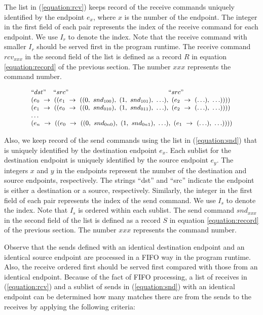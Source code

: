 The list in (\ref{equation:rcv}) keeps record of the receive commands uniquely identified by the endpoint $\mathit{e}_x$, where $x$ is the number of the endpoint. The integer in the first field of each pair represents the index of the receive command for each endpoint. We use $I_r$ to denote the index. Note that the receive command with smaller $I_r$ should be served first in the program runtime. The receive command $rcv_{xxx}$ in the second field of the list is defined as a record $R$ in equation \ref{equation:record} of the previous section. The number $xxx$ represents the command number.

\begin{equation}
\footnotesize \begin{array}{l}
 ``dst" \;\;\;\; ``src" \;\;\;\;\;\;\;\;\;\;\;\;\;\;\;\;\;\;\;\;\;\;\;\;\;\;\;\;\;\;\;\;\;\;\;\;\;\;\;\;\;\;\;\;\;\;\;\;\;\;\;\;\;\;\; ``src"\\
(e_0\ \rightarrow\ ((e_1\ \rightarrow\ ((0,\ snd_{100}),\ (1,\ snd_{101}),\ \ldots),\ (e_2\ \rightarrow\ (\ldots),\ \ldots))))\\
(e_1\ \rightarrow\ ((e_0\ \rightarrow\ ((0,\ snd_{010}),\ (1,\ snd_{011}),\ \ldots),\ (e_2\ \rightarrow\ (\ldots),\ \ldots))))\\
 \dots\\
(e_n\ \rightarrow\ ((e_0\ \rightarrow\ ((0,\ snd_{0n0}),\ (1,\ snd_{0n1}),\ \ldots),\ (e_1\ \rightarrow\ (\ldots),\ \ldots))))\\
\end{array}
\label{equation:snd}
\end{equation}

Also, we keep record of the send commands using the list in (\ref{equation:snd}) that is uniquely identified by the destination endpoint $\mathit{e}_x$. Each sublist for the destination endpoint is uniquely identified by the source endpoint $\mathit{e}_y$. The integers $x$ and $y$ in the endpoints represent the number of the destination and source endpoints, respectively. The strings ``dst'' and ``src'' indicate the endpoint is either a destination or a source, respectively. Similarly, the integer in the first field of each pair represents the index of the send command. We use $I_s$ to denote the index. Note that $I_s$ is ordered within each sublist. The send command $snd_{xxx}$ in the second field of the list is defined as a record $S$ in equation \ref{equation:record} of the previous section. The number $xxx$ represents the command number.

Observe that the sends defined with an identical destination endpoint and an identical source endpoint are processed in a FIFO way in the program runtime. Also, the receive ordered first should be served first compared with those from an identical endpoint. Because of the fact of FIFO processing, a list of receives in (\ref{equation:rcv}) and a sublist of sends in (\ref{equation:snd}) with an identical endpoint can be determined how many matches there are from the sends to the receives by applying the following criteria:

